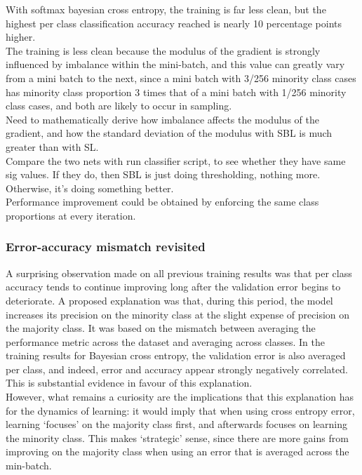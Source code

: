 \documentclass[a4paper,11pt]{article}
\begin{document}
With softmax bayesian cross entropy, the training is far less clean, but the highest per class classification accuracy reached is nearly 10 percentage points higher. \\

The training is less clean because the modulus of the gradient is strongly influenced by imbalance within the mini-batch, and this value can greatly vary from a mini batch to the next, since a mini batch with 3/256 minority class cases has minority class proportion 3 times that of a mini batch with 1/256 minority class cases, and both are likely to occur in sampling. \\

Need to mathematically derive how imbalance affects the modulus of the gradient, and how the standard deviation of the modulus with SBL is much greater than with SL. \\

Compare the two nets with run classifier script, to see whether they have same sig values. If they do, then SBL is just doing thresholding, nothing more. Otherwise, it's doing something better. \\

Performance improvement could be obtained by enforcing the same class proportions at every iteration. \\


\subsubsection{Error-accuracy mismatch revisited}

A surprising observation made on all previous training results was that per class accuracy tends to continue improving long after the validation error begins to deteriorate. A proposed explanation was that, during this period, the model increases its precision on the minority class at the slight expense of precision on the majority class. It was based on the mismatch between averaging the performance metric across the dataset and averaging across classes. In the training results for Bayesian cross entropy, the validation error is also averaged per class, and indeed, error and accuracy appear strongly negatively correlated. This is substantial evidence in favour of this explanation. \\

However, what remains a curiosity are the implications that this explanation has for the dynamics of learning: it would imply that when using cross entropy error, learning `focuses' on the majority class first, and afterwards focuses on learning the minority class. This makes `strategic' sense, since there are more gains from improving on the majority class when using an error that is averaged across the min-batch. 
\end{document}
